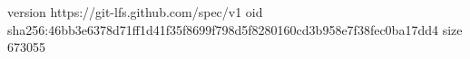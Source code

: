 version https://git-lfs.github.com/spec/v1
oid sha256:46bb3e6378d71ff1d41f35f8699f798d5f8280160cd3b958e7f38fec0ba17dd4
size 673055
